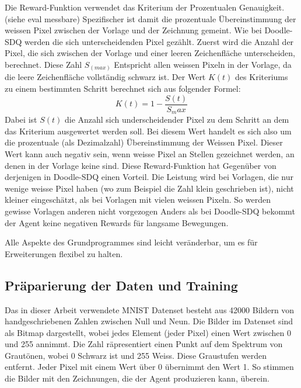 Die Reward-Funktion verwendet das Kriterium der Prozentualen Genauigkeit. (siehe eval messbare)
Spezifischer ist damit die prozentuale Übereinstimmung der weissen Pixel zwischen der Vorlage und der Zeichnung
gemeint. Wie bei Doodle-SDQ werden die sich unterscheidenden Pixel
gezählt. Zuerst wird die Anzahl der Pixel, die sich zwischen der Vorlage und
einer leeren Zeichenfläche unterscheiden, berechnet. Diese Zahl $S_(max)$
Entspricht allen weissen Pixeln in der Vorlage, da die leere Zeichenfläche
vollständig schwarz ist. Der Wert $K(t)$ des Kriteriums zu einem bestimmten
Schritt berechnet sich aus folgender Formel: 
$$ K(t) = 1 - \frac{S(t)}{S_max} $$ Dabei ist $S(t)$ die Anzahl sich
underscheidender Pixel zu dem Schritt an dem das Kriterium ausgewertet werden
soll. Bei diesem Wert handelt es sich also um die prozentuale (als Dezimalzahl)
Übereinstimmung der Weissen Pixel. Dieser Wert kann auch negativ sein, wenn
weisse Pixel an Stellen gezeichnet werden, an denen in der Vorlage keine sind.
Diese Reward-Funktion hat Gegenüber von derjenigen in Doodle-SDQ einen Vorteil. Die Leistung wird bei Vorlagen, die nur wenige
weisse Pixel haben (wo zum Beispiel die Zahl klein geschrieben ist), nicht
kleiner eingeschätzt, als bei Vorlagen mit vielen weissen Pixeln. So werden gewisse Vorlagen anderen nicht vorgezogen
Anders als bei Doodle-SDQ bekommt der Agent keine negativen
Rewards für langsame Bewegungen. 

Alle Aspekte des Grundprogrammes sind leicht veränderbar, um es für
Erweiterungen flexibel zu halten.


\subsection*{Präparierung der Daten und Training}
Das in dieser Arbeit verwendete MNIST Datenset besteht aus 42000 Bildern von
handgeschriebenen Zahlen zwischen Null und Neun. Die Bilder im Datenset sind als
Bitmap dargestellt, wobei jedes Element (jeder Pixel) einen Wert zwischen 0 und
255 annimmt. Die Zahl räpresentiert einen Punkt auf dem Spektrum von Grautönen,
wobei 0 Schwarz ist und 255 Weiss. Diese Graustufen werden entfernt. Jeder Pixel
mit einem Wert über 0 übernimmt den Wert 1. So stimmen die Bilder mit den
Zeichnungen, die der Agent produzieren kann, überein.

